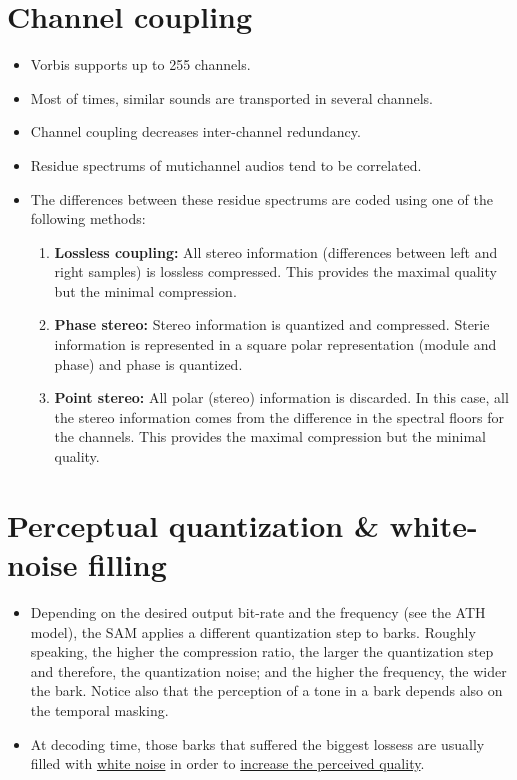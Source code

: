 \begin{itemize}
\section{Channel coupling}

\begin{itemize}
\item Vorbis supports up to 255 channels.
\item Most of times, similar sounds are transported in several
  channels.
\item Channel coupling decreases inter-channel redundancy.
\item Residue spectrums of mutichannel audios tend to be correlated.
\item The differences between these residue spectrums are coded using
  one of the following methods:
  \begin{enumerate}
  \item \textbf{Lossless coupling:} All stereo information
    (differences between left and right samples) is lossless
    compressed. This provides the maximal quality but the minimal
    compression.
  \item \textbf{Phase stereo:} Stereo information is quantized and
    compressed. Sterie information is represented in a square polar
    representation (module and phase) and phase is quantized.
  \item \textbf{Point stereo:} All polar (stereo) information is
    discarded. In this case, all the stereo information comes from the
    difference in the spectral floors for the channels. This provides
    the maximal compression but the minimal quality.
  \end{enumerate}
\end{itemize}


\section{Perceptual quantization & white-noise filling}

\begin{itemize}
\item Depending on the desired output bit-rate and the frequency (see
  the ATH model), the SAM applies a different quantization step to
  barks. Roughly speaking, the higher the compression ratio, the
  larger the quantization step and therefore, the quantization noise;
  and the higher the frequency, the wider the bark. Notice also that
  the perception of a tone in a bark depends also on the temporal
  masking.
\item At decoding time, those barks that suffered the biggest lossess
  are usually filled with
  \href{http://en.wikipedia.org/wiki/White_noise}{white noise} in
  order to \href{http://simplynoise.com/}{increase the perceived
    quality}.
\end{itemize}



\end{itemize}
